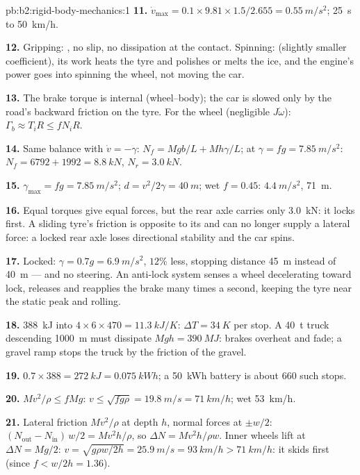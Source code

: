 \begin{solution}{pb:b2:rigid-body-mechanics:1}
\textbf{11.} $\dot v_{\max} = 0.1 \times 9.81 \times 1.5/2.655 = \qty{0.55}{m/s^2}$;
\qty{25}{s} to \qty{50}{km/h}.

\textbf{12.} Gripping: , no slip, no dissipation at the
contact. Spinning:  (slightly smaller coefficient),
its work heats the tyre and polishes or melts the ice, and the engine's
power goes into spinning the wheel, not moving the car.

\textbf{13.} The brake torque is internal (wheel--body); the car is
slowed only by the road's backward friction on the tyre. For the wheel
(negligible $J\dot\omega$): $\Gamma_b \approx T_iR \le fN_iR$.

\textbf{14.} Same balance with $\dot v = -\gamma$: $N_f = Mgb/L + Mh\gamma/L$;
at $\gamma = fg = \qty{7.85}{m/s^2}$: $N_f = 6792 + 1992 = \qty{8.8}{kN}$, $N_r =
\qty{3.0}{kN}$.

\textbf{15.} $\gamma_{\max} = fg = \qty{7.85}{m/s^2}$; $d = v^2/2\gamma = \qty{40}{m}$;
wet $f = 0.45$: $\qty{4.4}{m/s^2}$, \qty{71}{m}.

\textbf{16.} Equal torques give equal forces, but the rear axle carries
only \qty{3.0}{kN}: it locks first. A sliding tyre's friction is opposite
to its  and can no longer supply a lateral force: a locked
rear axle loses directional stability and the car spins.

\textbf{17.} Locked: $\gamma = 0.7g = \qty{6.9}{m/s^2}$, $12\%$ less, stopping
distance \qty{45}{m} instead of \qty{40}{m} --- and no steering. An
anti-lock system senses a wheel decelerating toward lock, releases and
reapplies the brake many times a second, keeping the tyre near the
static peak and rolling.

\textbf{18.} \qty{388}{kJ} into $4 \times 6 \times 470 = \qty{11.3}{kJ/K}$: $\Delta T =
\qty{34}{K}$ per stop. A \qty{40}{t} truck descending \qty{1000}{m} must dissipate
$Mgh = \qty{390}{MJ}$: brakes overheat and fade; a gravel ramp stops the
truck by the friction of the gravel.

\textbf{19.} $0.7 \times 388 = \qty{272}{kJ} = \qty{0.075}{kWh}$; a \qty{50}{kWh}
battery is about $660$ such stops.

\textbf{20.} $Mv^2/\rho \le fMg$: $v \le \sqrt{fg\rho} = \qty{19.8}{m/s} =
\qty{71}{km/h}$; wet \qty{53}{km/h}.

\textbf{21.} Lateral friction $Mv^2/\rho$ at depth $h$, normal forces at
$\pm w/2$: $(N_{\text{out}} - N_{\text{in}})\,w/2 = Mv^2h/\rho$, so $\Delta N =
Mv^2h/\rho w$. Inner wheels lift at $\Delta N = Mg/2$: $v = \sqrt{g\rho w/2h} =
\qty{25.9}{m/s} = \qty{93}{km/h} > \qty{71}{km/h}$: it skids first (since $f <
w/2h = 1.36$).


\end{solution}
